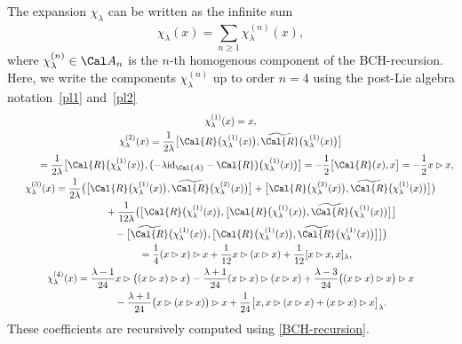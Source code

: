 \documentclass[pdftex]{sigma}
\numberwithin{equation}{section}
\begin{document}
The expansion $\chi_{\lambda}$ can be written as the infinite sum
\begin{equation*}
\chi^{}_{\lambda}(x) = \sum_{n \ge 1}^{}{\chi_{\lambda}^{(n)}(x)},
\end{equation*}
where $\chi_{\lambda}^{(n)}\in\Cal A_n$ is the $n$-th homogenous component of the BCH-recursion. Here, we write the components $\chi_{\lambda}^{(n)}$ up to order $n =4$ using the post-Lie algebra notation~\eqref{pl1} and~\eqref{pl2}
\begin{gather*}
\chi_{\lambda}^{(1)}(x) = x,
\\
\chi_{\lambda}^{(2)}(x) = \frac{1}{2\lambda} \big[\Cal{R}\big(\chi_{\lambda}^{(1)}(x)\big), \widetilde{\Cal{R}}\big(\chi_{\lambda}^{(1)}(x)\big)\big]
\\ \hphantom{\chi_{\lambda}^{(2)}(x) }
{}= \frac{1}{2\lambda} \big[\Cal{R}\big(\chi_{\lambda}^{(1)}(x)\big), \big({-}\lambda {\rm id}_{\Cal{A}}
- \Cal{R} \big)\big(\chi_{\lambda}^{(1)}(x)\big)\big]
 = - \frac{1}{2} \big[\Cal{R}(x), x\big]= - \frac{1}{2} x \rhd x,
 \\
\chi_{\lambda}^{(3)}(x)
= \frac{1}{2 \lambda} \big(\big[\Cal{R}\big(\chi_{\lambda}^{(1)}(x)\big), \widetilde{\Cal{R}}\big(\chi_{\lambda}^{(2)}(x)\big)\big]
+ \big[\Cal{R}\big(\chi_{\lambda}^{(2)}(x)\big), \widetilde{\Cal{R}}\big(\chi_{\lambda}^{(1)}(x)\big)\big]\big)
\\ \hphantom{\chi_{\lambda}^{(3)}(x)=}
{}+ \frac{1}{12 \lambda}\big(\big[\Cal{R}\big(\chi_{\lambda}^{(1)}(x)\big),\big[\Cal{R}\big(\chi_{\lambda}^{(1)}(x)\big), \widetilde{\Cal{R}}\big(\chi_{\lambda}^{(1)}(x)\big)\big]\big]
\\ \hphantom{\chi_{\lambda}^{(3)}(x)=}
{}- \big[\widetilde{\Cal{R}}\big(\chi_{\lambda}^{(1)}(x)\big),\big[\Cal{R}\big(\chi_{\lambda}^{(1)}(x)\big), \widetilde{\Cal{R}}\big(\chi_{\lambda}^{(1)}(x)\big)\big]\big]\big)
\\ \hphantom{\chi_{\lambda}^{(3)}(x)}
{} = \frac{1}{4} ( x \rhd x) \rhd x + \frac{1}{12}x \rhd (x \rhd x) + \frac{1}{12} [x\rhd x, x]_\lambda,
 \\
\chi_{\lambda}^{(4)}(x)= \frac{\lambda-1}{24} x \rhd \big((x \rhd x) \rhd x\big)
- \frac{\lambda + 1}{24} (x \rhd x) \rhd (x \rhd x)
+ \frac{\lambda -3}{24} \big((x \rhd x) \rhd x\big) \rhd x
\\ \hphantom{\chi_{\lambda}^{(4)}(x)=}
{}-\frac{\lambda + 1}{24} \big(x \rhd (x \rhd x)\big) \rhd x
+ \frac{1}{24} \big[x, x \rhd (x \rhd x) + (x \rhd x) \rhd x\big]_\lambda.
\end{gather*}
These coefficients are recursively computed using \eqref{BCH-recursion}.
\end{document}
